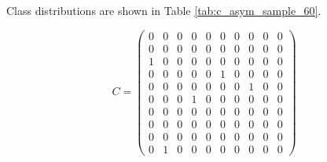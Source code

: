 \documentclass{article}
\begin{document}
Class distributions are shown in Table \ref{tab:c_asym_sample_60}.

\begin{table*}
\begin{equation}
\label{eqn:c_asym_patrini}
 C = \left( \begin{matrix} 0 & 0 & 0 & 0 & 0 & 0 & 0 & 0 & 0 & 0 \\ 0 & 0 & 0 & 0 & 0 & 0 & 0 & 0 & 0 & 0 \\ 1 & 0 & 0 & 0 & 0 & 0 & 0 & 0 & 0 & 0 \\ 0 & 0 & 0 & 0 & 0 & 1 & 0 & 0 & 0 & 0 \\ 0 & 0 & 0 & 0 & 0 & 0 & 0 & 1 & 0 & 0 \\ 0 & 0 & 0 & 1 & 0 & 0 & 0 & 0 & 0 & 0 \\ 0 & 0 & 0 & 0 & 0 & 0 & 0 & 0 & 0 & 0 \\ 0 & 0 & 0 & 0 & 0 & 0 & 0 & 0 & 0 & 0 \\ 0 & 0 & 0 & 0 & 0 & 0 & 0 & 0 & 0 & 0 \\ 0 & 1 & 0 & 0 & 0 & 0 & 0 & 0 & 0 & 0 \end{matrix} \right) 
\end{equation}
\end{table*}
\end{document}
